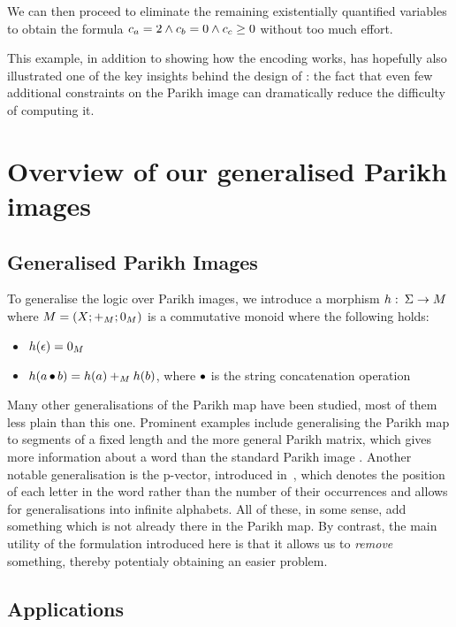 \documentclass[acmsmall,review,anonymous,screen]{acmart}\settopmatter{printfolios=true,printccs=false,printacmref=true}
\theoremstyle{definition}
\begin{document}
We can then proceed to eliminate the remaining existentially quantified
variables to obtain the formula $c_{a} = 2 \land c_{b} = 0
\land c_{c} \geq 0$ without too much effort.

  This example, in addition to showing how the encoding works, has hopefully
  also illustrated one of the key insights behind the design of \Calculus: the
  fact that even few additional constraints on the Parikh image can dramatically
  reduce the difficulty of computing it.

\section{Overview of our generalised Parikh images}

\subsection{Generalised Parikh Images}\label{sec:generalised}

To generalise the logic over Parikh images, we introduce a morphism $h:\: \Sigma
\to M$ where $M = \left(X;+_{M};0_{M}\right)$ is a commutative monoid where the following holds:
\begin{itemize}
  \item $h(\epsilon) = 0_{M}$
  \item $h(a \operatorname{\bullet} b) = h(a) +_{M} h(b)$, where $\operatorname{\bullet}$ is
  the string concatenation operation
\end{itemize}

Many other generalisations of the Parikh map have been studied, most of them
less plain than this one. Prominent examples include generalising the Parikh map
to segments of a fixed length \cite{KARHUMAKI1980155} and the more general
Parikh matrix, which gives more information about a word than the standard
Parikh image \cite{parikh-matrix}. Another notable generalisation is the
p-vector, introduced in~\cite{infinite-words}, which denotes the position of
each letter in the word rather than the number of their occurrences and allows
for generalisations into infinite alphabets. All of these, in some sense, add
something which is not already there in the Parikh map. By contrast, the main
utility of the formulation introduced here is that it allows us to \emph{remove}
something, thereby potentialy obtaining an easier problem.

\subsection{Applications}
\end{document}
